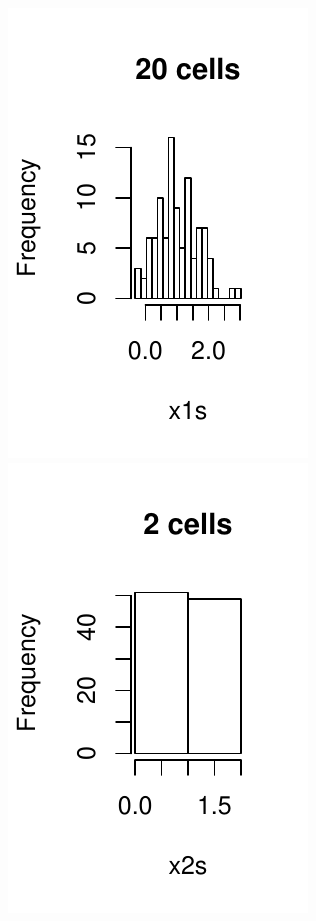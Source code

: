 \documentclass[a4paper, oneside, final]{memoir}
\begin{document}
\includegraphics{img/question15-plot-1-c.pdf}
\includegraphics{img/question15-plot-2-a.pdf}
\end{document}
